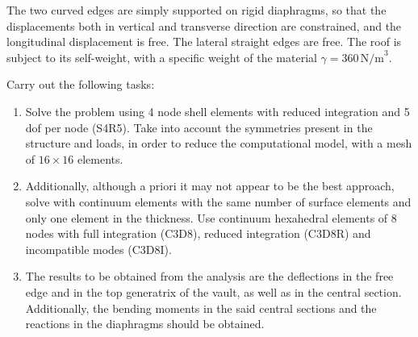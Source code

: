 \documentclass[english,a4paper,12pt]{article}
\begin{document}
The two curved edges are simply supported on rigid diaphragms, so that the displacements both in vertical and transverse direction are constrained, and the longitudinal displacement is free.
The lateral straight edges are free.
The roof is subject to its self-weight, with a specific weight of the material $\gamma=360\,\text{N/m}^{3}$.

Carry out the following tasks:
\begin{enumerate}
\item
Solve the problem using 4 node shell elements with reduced integration and 5 dof per node (S4R5).
Take into account the symmetries present in the structure and loads, in order to reduce the computational model, with a mesh of $16\times 16$ elements.
\item
Additionally, although a priori it may not appear to be the best approach, solve with continuum elements with the same number of surface elements and only one element in the thickness.
Use continuum hexahedral elements of 8 nodes with full integration (C3D8), reduced integration (C3D8R) and incompatible modes (C3D8I).
\item
The results to be obtained from the analysis are the deflections in the free edge and in the top generatrix of the vault, as well as in the central section.
Additionally, the bending moments in the said central sections and the reactions in the diaphragms should be obtained.
\end{enumerate}
\end{document}
